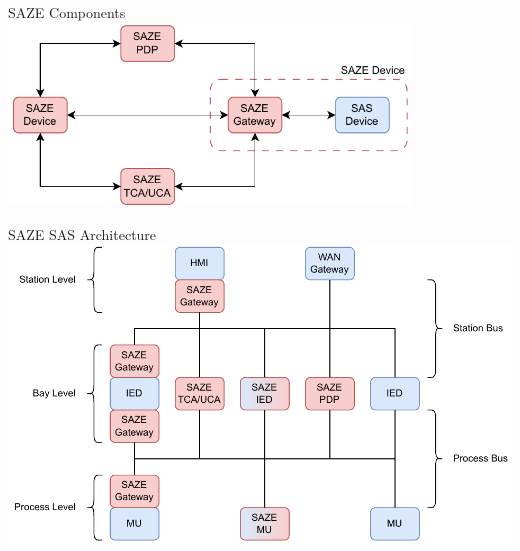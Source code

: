 \documentclass[en]{sdqbeamer}
\begin{document}
\begin{frame}{SAZE Components}
    \centering
	\includegraphics[width=0.8\textwidth]{./figures/saze_components_color.drawio.pdf}
\end{frame}

\begin{frame}{SAZE SAS Architecture}
    \centering
    \includegraphics[height=0.75\textheight]{./figures/saze_architecture_color.drawio.pdf}
\end{frame}
\end{document}
